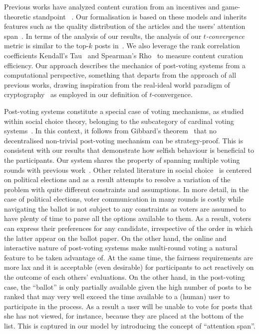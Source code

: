 \documentclass[a4paper,english,cleveref, autoref]{oasics-v2019}
\begin{document}
  Previous works have analyzed content curation from an incentives and
  game-theoretic
  standpoint~\cite{ghosh2011incentivizing,das2010ranking,gupte2009news,may2014filter,abbassi2014distributed}
  . Our formalisation is based on these models and inherits features such as the
  quality distribution of the articles and the users' attention
  span~\cite{askalidis2013theoretical,ghosh2011incentivizing}. In terms of the
  analysis of our results, the analysis of our \textit{$t$-convergence} metric
  is similar to the top-$k$ posts in~\cite{askalidis2013theoretical}. We also
  leverage the rank correlation coefficients Kendall's
  Tau~\cite{kendall1955rank} and Spearman's Rho~\cite{spearman1904proof} to
  measure content curation efficiency. Our approach describes the mechanics of
  post-voting systems from a computational perspective, something that departs
  from the approach of all previous works, drawing inspiration from the
  real-ideal world paradigm of
  cryptography~\cite{goldreich1999foundations,lindell} as employed in our
  definition of $t$-convergence.

  Post-voting systems constitute a special case of voting mechanisms, as studied
  within social choice theory, belonging to the subcategory of cardinal voting
  systems~\cite{hillinger2005case}. In this context, it follows from Gibbard's
  theorem~\cite{gibbard1973manipulation} that no decentralised non-trivial
  post-voting mechanism can be strategy-proof. This is consistent with our
  results that demonstrate how selfish behaviour is beneficial to the
  participants. Our system shares the property of spanning multiple voting
  rounds with previous work~\cite{kalech2011practical}. Other related literature
  in social
  choice~\cite{lu2011robust,conitzer2005communication,xia2010compilation} is
  centered on political elections and as a result attempts to resolve a
  variation of the problem with quite different constraints and assumptions. In
  more detail, in the case of political elections, voter communication in many
  rounds is costly while navigating the ballot is not subject to any constraints
  as voters are assumed to have plenty of time to parse all the options
  available to them. As a result, voters can express their preferences for any
  candidate, irrespective of the order in which the latter appear on the ballot
  paper. On the other hand, the online and interactive nature of post-voting
  systems make multi-round voting a natural feature to be taken advantage of. At
  the same time, the fairness requirements are more lax and it is acceptable
  (even desirable) for participants to act reactively on the outcome of each
  others' evaluations. On the other hand, in the post-voting case, the
  ``ballot'' is only partially available given the high number of posts to be
  ranked that may very well exceed the time available to a (human) user to
  participate in the process. As a result a user will be unable to vote for
  posts that she has not viewed, for instance, because they are placed at the
  bottom of the list. This is captured in our model by introducing the concept
  of ``attention span''.
\end{document}
